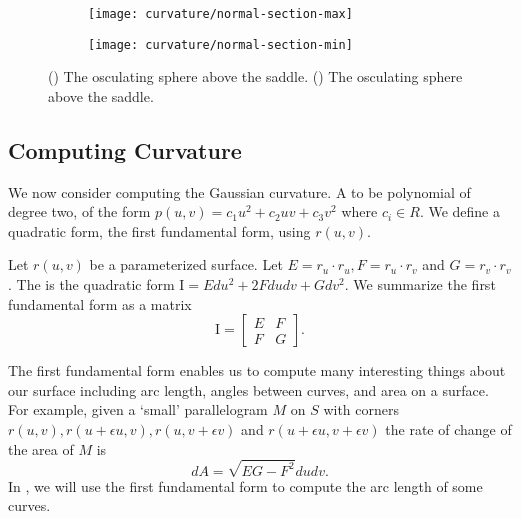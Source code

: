 \begin{figure}[htb]
    \captionsetup[subfigure]{justification=centering}
    \centering
    \begin{subfigure}[b]{0.25\textwidth}
        \texttt{[image: curvature/normal-section-max]}
       \subcaption{}\label{fig:normal-section-max}
    \end{subfigure}
        \hspace{1cm}
        \begin{subfigure}[b]{0.25\textwidth}
        \texttt{[image: curvature/normal-section-min]}
        \subcaption{}\label{fig:normal-section-min}
        \end{subfigure}
    \caption{() The osculating sphere above the saddle.
        () The osculating sphere above the saddle.
    }
    \label{fig:normal-sections}
\end{figure}


\subsection{Computing Curvature}
We now consider computing the Gaussian curvature.
A  to be polynomial of degree two, of the form $p(u,v)=c_1u^2+c_2uv+c_3v^2$ 
where $c_i\in R$.
We define a quadratic form, the first fundamental form, using $r(u,v)$.

Let $r(u,v)$ be a parameterized surface.
Let $E=r_u\cdot r_u, F=r_u\cdot r_v$ and  $G=r_v\cdot r_v$.
The 
is the quadratic form $\mathrm{I}=Edu^2+2Fdudv +Gdv^2$.
We summarize the first fundamental form as a matrix $$\mathrm{I}=\begin{bmatrix}
E & F \\
F & G 
\end{bmatrix}.$$

The first fundamental form enables us to  compute many interesting
things about our surface including arc length, angles between curves,
and area on a surface.
For example,
given a `small' parallelogram $M$ on $S$ with corners $r(u,v),r(u+\epsilon u, v), r(u,v+\epsilon v)$ 
and $r(u+\epsilon u, v+\epsilon v)$ the rate of change of the area of $M$ is 
$$dA=\sqrt{EG-F^2}dudv.$$
In , we will use the first fundamental form to compute the arc length of some curves.


